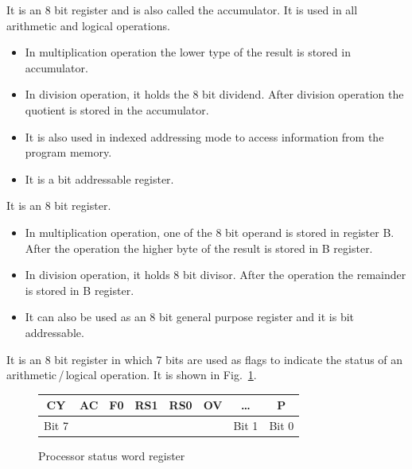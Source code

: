 \eject


It is an 8 bit register and is also called the accumulator. It is used in all arithmetic and logical operations.
\begin{itemize}
\itemsep=0pt
\item In multiplication operation the lower type of the result is stored in accumulator.

\item In division operation, it holds the 8 bit dividend. After division operation the quotient is stored in the accumulator.

\item It is also used in indexed addressing mode to access information from the program memory.

\item It is a bit addressable register. 
\end{itemize}


It is an 8 bit register.
\begin{itemize}
\itemsep=0pt
\item In multiplication operation, one of the 8 bit operand is stored in register B. After the operation the higher byte of the result is stored in B register.

\item In division operation, it holds 8 bit divisor. After the operation the remainder is stored in B register.

\item It can also be used as an 8 bit general purpose register and it is bit addressable.
\end{itemize}


\smallskip
It is an 8 bit register in which 7 bits are used as flags to indicate the status of an arithmetic\,/\,logical operation. It is shown in Fig.~\ref{fig7.9}.
\begin{figure}[H]
\centering
\caption{Processor status word register}\label{fig7.9}
\renewcommand{\arraystretch}{1.2}
\begin{tabular}{|c|c|c|c|c|c|c|c|}
\hline
CY & AC & F0 & RS1 & RS0 & OV & \ldots & P\\
\hline
\multicolumn{1}{c}{Bit 7} & \multicolumn{5}{c}{} & \multicolumn{1}{c}{Bit 1} & \multicolumn{1}{c}{Bit 0}
\end{tabular}
\end{figure}

